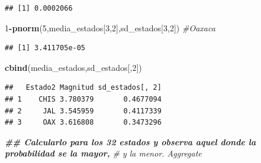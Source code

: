 \documentclass[
]{article}
\newenvironment{Shaded}{\begin{snugshade}}{\end{snugshade}}
\newcommand{\AttributeTok}[1]{\textcolor[rgb]{0.13,0.29,0.53}{#1}}
\newcommand{\CommentTok}[1]{\textcolor[rgb]{0.56,0.35,0.01}{\textit{#1}}}
\newcommand{\ConstantTok}[1]{\textcolor[rgb]{0.56,0.35,0.01}{#1}}
\newcommand{\DecValTok}[1]{\textcolor[rgb]{0.00,0.00,0.81}{#1}}
\newcommand{\DocumentationTok}[1]{\textcolor[rgb]{0.56,0.35,0.01}{\textbf{\textit{#1}}}}
\newcommand{\FunctionTok}[1]{\textcolor[rgb]{0.13,0.29,0.53}{\textbf{#1}}}
\newcommand{\NormalTok}[1]{#1}
\newcommand{\OtherTok}[1]{\textcolor[rgb]{0.56,0.35,0.01}{#1}}
\newcommand{\SpecialCharTok}[1]{\textcolor[rgb]{0.81,0.36,0.00}{\textbf{#1}}}
\begin{document}
\begin{verbatim}
## [1] 0.0002066
\end{verbatim}

\begin{Shaded}
\begin{Highlighting}[]
\DecValTok{1}\SpecialCharTok{{-}}\FunctionTok{pnorm}\NormalTok{(}\DecValTok{5}\NormalTok{,media\_estados[}\DecValTok{3}\NormalTok{,}\DecValTok{2}\NormalTok{],sd\_estados[}\DecValTok{3}\NormalTok{,}\DecValTok{2}\NormalTok{]) }\CommentTok{\#Oaxaca}
\end{Highlighting}
\end{Shaded}

\begin{verbatim}
## [1] 3.411705e-05
\end{verbatim}

\begin{Shaded}
\begin{Highlighting}[]
\FunctionTok{cbind}\NormalTok{(media\_estados,sd\_estados[,}\DecValTok{2}\NormalTok{])}
\end{Highlighting}
\end{Shaded}

\begin{verbatim}
##   Estado2 Magnitud sd_estados[, 2]
## 1    CHIS 3.780379       0.4677094
## 2     JAL 3.545959       0.4117339
## 3     OAX 3.616808       0.3473296
\end{verbatim}

\begin{Shaded}
\begin{Highlighting}[]
\DocumentationTok{\#\# Calcularlo para los 32 estados y observa aquel donde la probabilidad se la mayor,}
\CommentTok{\# y la menor. Aggregate}
\end{Highlighting}
\end{Shaded}

\begin{Shaded}
\end{Shaded}
\end{document}
